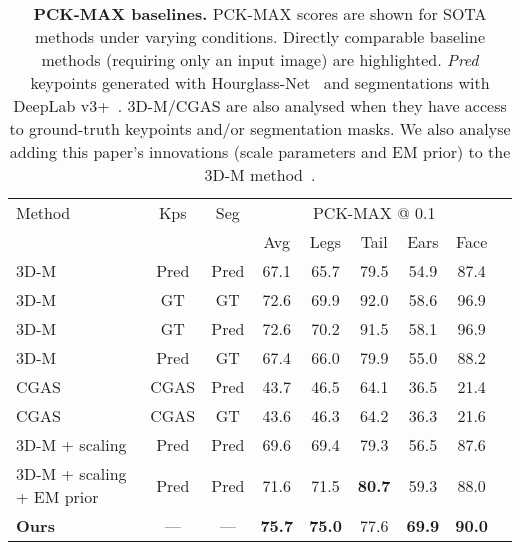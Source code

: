\begin{table}[]
{
    \small
    \centering
    \begin{tabular}{@{}lcccccccc@{}}
    \toprule
    \multicolumn{1}{l}{Method} & 
    \multicolumn{1}{c}{Kps} & 
    \multicolumn{1}{c}{Seg} & 
    \multicolumn{5}{c}{PCK-MAX @ 0.1} \\
    \multicolumn{3}{c}{} &
    \multicolumn{1}{c}{Avg} &
    \multicolumn{1}{c}{Legs} &
    \multicolumn{1}{c}{Tail} &
    \multicolumn{1}{c}{Ears} &
    \multicolumn{1}{c}{Face} \\
    \midrule
    \rowcolor{comp} 3D-M~\cite{zuffi2017menagerie} & Pred & Pred & 67.1 & 65.7 & 79.5 & 54.9 & 87.4  \\
    \rowcolor{notcomp} 3D-M & GT & GT & 72.6 & 69.9 & 92.0 & 58.6 & 96.9 \\
    \rowcolor{notcomp} 3D-M & GT & Pred & 72.6 & 70.2 & 91.5 & 58.1 & 96.9 \\ 
    \rowcolor{notcomp} 3D-M & Pred & GT & 67.4 & 66.0 & 79.9 & 55.0 & 88.2 \\ 
    \hline
    \rowcolor{comp} CGAS~\cite{biggs2018creatures} & CGAS & Pred & 43.7 & 46.5 & 64.1 & 36.5 & 21.4  \\
    \rowcolor{notcomp} CGAS & CGAS & GT & 43.6 & 46.3 & 64.2 & 36.3 & 21.6 \\
    \hline
    \rowcolor{comp} 3D-M + scaling & Pred & Pred & 69.6 & 69.4 & 79.3 & 56.5 & 87.6 \\
    \rowcolor{comp} 3D-M + scaling + EM prior & Pred & Pred & 71.6 & 71.5 & \textbf{80.7} & 59.3 & 88.0 \\
    \hline
    \rowcolor{comp} \textbf{Ours} & --- & --- & \textbf{75.7} & \textbf{75.0} & 77.6 & \textbf{69.9} & \textbf{90.0} \\
    \bottomrule 
    \end{tabular}
    \caption{\label{tab:baselines}\textbf{PCK-MAX baselines.} PCK-MAX scores are shown for SOTA methods under varying conditions. Directly comparable baseline methods (requiring only an input image) are highlighted. \emph{Pred} keypoints generated with Hourglass-Net~\cite{newell2016stacked} and segmentations with DeepLab v3+~\cite{journals/corr/ChenPK0Y16}. 3D-M/CGAS are also analysed when they have access to ground-truth keypoints and/or segmentation masks. We also analyse adding this paper's innovations (scale parameters and EM prior) to the 3D-M method~\cite{zuffi2017menagerie}.}
}
\end{table}